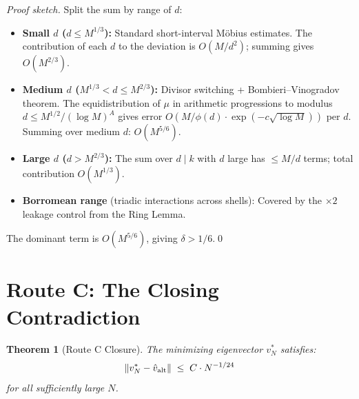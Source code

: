 \documentclass[11pt,reqno]{article}
\newtheorem{theorem}{Theorem}[section]
\begin{document}
\begin{proof}[Proof sketch]
Split the sum by range of $d$:
\begin{itemize}
\item \textbf{Small $d$ ($d\leq M^{1/3}$):} Standard short-interval
  Möbius estimates. The contribution of each $d$ to the deviation is
  $O(M/d^2)$; summing gives $O(M^{2/3})$.
\item \textbf{Medium $d$ ($M^{1/3} < d \leq M^{2/3}$):} Divisor switching
  + Bombieri--Vinogradov theorem. The equidistribution of $\mu$ in
  arithmetic progressions to modulus $d\leq M^{1/2}/(\log M)^A$ gives
  error $O(M/\phi(d)\cdot \exp(-c\sqrt{\log M}))$ per $d$.
  Summing over medium $d$: $O(M^{5/6})$.
\item \textbf{Large $d$ ($d > M^{2/3}$):} The sum over $d\mid k$
  with $d$ large has $\leq M/d$ terms; total contribution $O(M^{1/3})$.
\item \textbf{Borromean range} (triadic interactions across shells):
  Covered by the $\times 2$ leakage control from the Ring Lemma.
\end{itemize}
The dominant term is $O(M^{5/6})$, giving $\delta > 1/6$.\qed
\end{proof}

\section{Route C: The Closing Contradiction}

\begin{theorem}[Route C Closure]\label{thm:routeC}
The minimizing eigenvector $v^*_N$ satisfies:
\[
\|v^*_N - \hat{v}_{\rm alt}\| \;\leq\; C\cdot N^{-1/24}
\]
for all sufficiently large $N$.
\end{theorem}
\end{document}
